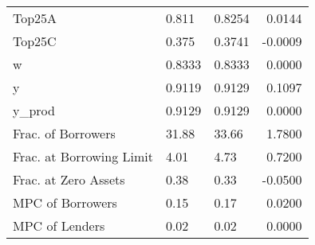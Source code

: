 \begin{table}
\begin{tabular}{lllr}
                  Top25A &   0.811 &   0.8254 &  0.0144 \\
                  Top25C &   0.375 &   0.3741 & -0.0009 \\
                       w &  0.8333 &   0.8333 &  0.0000 \\
                       y &  0.9119 &   0.9129 &  0.1097 \\
                  y\_prod &  0.9129 &   0.9129 &  0.0000 \\
      Frac. of Borrowers &   31.88 &    33.66 &  1.7800 \\
Frac. at Borrowing Limit &    4.01 &     4.73 &  0.7200 \\
    Frac. at Zero Assets &    0.38 &     0.33 & -0.0500 \\
        MPC of Borrowers &    0.15 &     0.17 &  0.0200 \\
          MPC of Lenders &    0.02 &     0.02 &  0.0000 \\
\bottomrule
\end{tabular}
\end{table}
